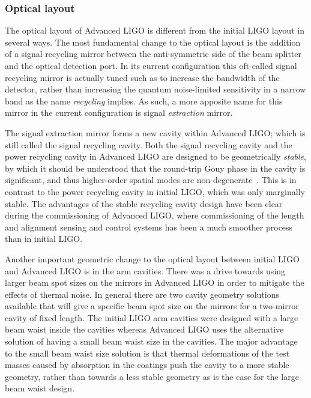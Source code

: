 \subsubsection{Optical layout}
The optical layout of Advanced LIGO is different from the initial LIGO layout in several ways. 
The most fundamental change to the optical layout is the addition of a signal recycling 
mirror between the anti-symmetric side of the beam splitter and the optical detection port. 
In its current configuration this oft-called signal recycling mirror is actually tuned such as to 
increase the bandwidth of the detector, rather than increasing the quantum noise-limited sensitivity
in a narrow band as the name \textit{recycling} implies. As such, a more apposite name for this mirror 
in the current configuration is signal \textit{extraction} mirror. 

The signal extraction mirror forms a new cavity within Advanced LIGO; which is still called the signal recycling cavity. 
Both the signal recycling cavity and the power recycling cavity in Advanced LIGO are designed to be 
geometrically \emph{stable}, by which it should be understood that the round-trip Gouy phase in the cavity 
is significant, and thus higher-order spatial modes are non-degenerate~\cite{Arain2008}. 
This is in contrast to the power recycling cavity in initial LIGO, which was only marginally stable. 
The advantages of the stable recycling cavity design have been clear during the commissioning of 
Advanced LIGO, where commissioning of the length and alignment sensing and control systems has 
been a much smoother process than in initial LIGO. 

Another important geometric change to the optical layout between initial LIGO and Advanced LIGO is 
in the arm cavities. There was a drive towards using larger beam spot sizes on the mirrors in Advanced 
LIGO in order to mitigate the effects of thermal noise. In general there are two cavity geometry solutions available 
that will give a specific beam spot size on the mirrors for a two-mirror cavity of fixed length. The initial LIGO 
arm cavities were designed with a large beam waist inside the cavities
whereas Advanced LIGO uses the alternative solution of having a small beam waist size in the cavities. 
The major advantage to the small beam waist size solution is that thermal deformations of the test masses caused by 
absorption in the coatings push the cavity to a more stable geometry, rather than towards a less stable geometry as 
is the case for the large beam waist design. 

